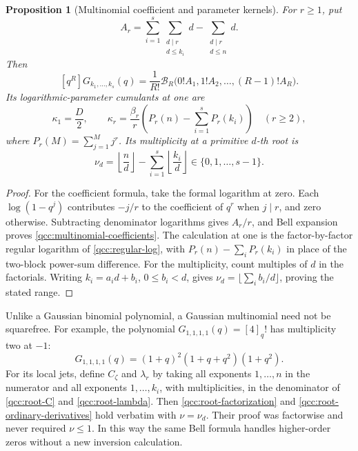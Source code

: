 \documentclass[11pt,a4paper,oneside,openany]{book}
\newtheorem{proposition}[theorem]{Proposition}
\theoremstyle{definition}
\theoremstyle{remark}
\newcommand{\Y}[1]{\mathcal B_{#1}}
\begin{document}
\begin{proposition}[Multinomial coefficient and parameter kernels]
\label{qcc:multinomial-kernels}
For \(r\ge1\), put
\[
 A_r=\sum_{i=1}^{s}\sum_{\substack{d\mid r\\d\le k_i}}d
           -\sum_{\substack{d\mid r\\d\le n}}d.
\]
Then
\begin{equation}\label{qcc:multinomial-coefficients}
 [q^R]G_{k_1,\ldots,k_s}(q)
   =\frac1{R!}\Y R\bigl(0!A_1,1!A_2,\ldots,(R-1)!A_R\bigr).
\end{equation}
Its logarithmic-parameter cumulants at one are
\begin{equation}\label{qcc:multinomial-cumulants}
 \kappa_1=\frac D2,\qquad
 \kappa_r=\frac{\beta_r}{r}
       \left(P_r(n)-\sum_{i=1}^{s}P_r(k_i)\right)\quad(r\ge2),
\end{equation}
where \(P_r(M)=\sum_{j=1}^{M}j^r\). Its multiplicity at a primitive
\(d\)-th root is
\begin{equation}\label{qcc:multinomial-carry}
 \nu_d=\left\lfloor\frac nd\right\rfloor
            -\sum_{i=1}^{s}\left\lfloor\frac{k_i}{d}\right\rfloor
          \in\{0,1,\ldots,s-1\}.
\end{equation}
\end{proposition}
\begin{proof}
For the coefficient formula, take the formal logarithm at zero. Each
\(\log(1-q^j)\) contributes \(-j/r\) to the coefficient of \(q^r\)
when \(j\mid r\), and zero otherwise. Subtracting denominator
logarithms gives \(A_r/r\), and Bell expansion proves
\eqref{qcc:multinomial-coefficients}. The calculation at one is the
factor-by-factor regular logarithm of \cref{qcc:regular-log}, with
\(P_r(n)-\sum_iP_r(k_i)\) in place of the two-block power-sum difference.
For the multiplicity, count multiples of \(d\) in the factorials.
Writing \(k_i=a_id+b_i\), \(0\le b_i<d\), gives
\(\nu_d=\lfloor\sum_i b_i/d\rfloor\), proving the stated range.
\end{proof}

Unlike a Gaussian binomial polynomial, a Gaussian multinomial need not be
squarefree. For example, the polynomial \(G_{1,1,1,1}(q)=[4]_q!\) has multiplicity
two at \(-1\):
\begin{equation}\label{qcc:multinomial-repeat-example}
 G_{1,1,1,1}(q)=(1+q)^2(1+q+q^2)(1+q^2).
\end{equation}
For its local jets, define \(C_\zeta\) and \(\lambda_r\) by taking
all exponents \(1,\ldots,n\) in the numerator and all exponents
\(1,\ldots,k_i\), with multiplicities, in the denominator of
\eqref{qcc:root-C} and \eqref{qcc:root-lambda}. Then
\eqref{qcc:root-factorization} and
\eqref{qcc:root-ordinary-derivatives} hold verbatim with
\(\nu=\nu_d\). Their proof was factorwise and never required
\(\nu\le1\). In this way the same Bell formula handles higher-order zeros
without a new inversion calculation.
\end{document}
